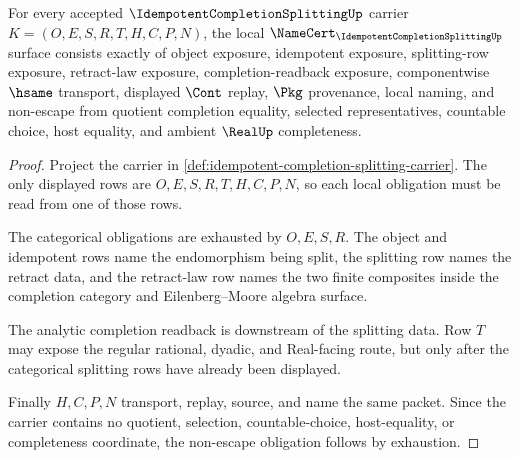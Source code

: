 \begin{theorem}
\label{thm:idempotent-completion-splitting-namecert-obligations}
For every accepted $\IdempotentCompletionSplittingUp$ carrier $K=(O,E,S,R,T,H,C,P,N)$, the local $\NameCert_{\IdempotentCompletionSplittingUp}$ surface consists exactly of object exposure, idempotent exposure, splitting-row exposure, retract-law exposure, completion-readback exposure, componentwise $\hsame$ transport, displayed $\Cont$ replay, $\Pkg$ provenance, local naming, and non-escape from quotient completion equality, selected representatives, countable choice, host equality, and ambient $\RealUp$ completeness.
\end{theorem}
\begin{proof}
Project the carrier in \autoref{def:idempotent-completion-splitting-carrier}. The only displayed rows are $O,E,S,R,T,H,C,P,N$, so each local obligation must be read from one of those rows.

The categorical obligations are exhausted by $O,E,S,R$. The object and idempotent rows name the endomorphism being split, the splitting row names the retract data, and the retract-law row names the two finite composites inside the completion category and Eilenberg--Moore algebra surface.

The analytic completion readback is downstream of the splitting data. Row $T$ may expose the regular rational, dyadic, and Real-facing route, but only after the categorical splitting rows have already been displayed.

Finally $H,C,P,N$ transport, replay, source, and name the same packet. Since the carrier contains no quotient, selection, countable-choice, host-equality, or completeness coordinate, the non-escape obligation follows by exhaustion.
\end{proof}

